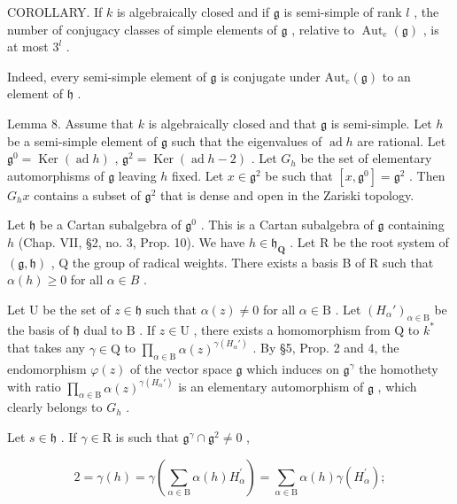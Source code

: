 COROLLARY. If \(k\) is algebraically closed and if \(\mathfrak{g}\) is semi-simple of rank \(l\) , the number of conjugacy classes of simple elements of \(\mathfrak{g}\) , relative to \(\operatorname{Aut}_e(\mathfrak{g})\) , is at most \(3^l\) .

Indeed, every semi-simple element of \(\mathfrak{g}\) is conjugate under \(\mathrm{Aut}_e(\mathfrak{g})\) to an element of \(\mathfrak{h}\) .

Lemma 8. Assume that \(k\) is algebraically closed and that \(\mathfrak{g}\) is semi-simple. Let \(h\) be a semi-simple element of \(\mathfrak{g}\) such that the eigenvalues of \(\operatorname{ad} h\) are rational. Let \(\mathfrak{g}^0 = \operatorname{Ker}(\operatorname{ad} h)\) , \(\mathfrak{g}^2 = \operatorname{Ker}(\operatorname{ad} h - 2)\) . Let \(G_h\) be the set of elementary automorphisms of \(\mathfrak{g}\) leaving \(h\) fixed. Let \(x \in \mathfrak{g}^2\) be such that \([x, \mathfrak{g}^0] = \mathfrak{g}^2\) . Then \(G_h x\) contains a subset of \(\mathfrak{g}^2\) that is dense and open in the Zariski topology.

Let \(\mathfrak{h}\) be a Cartan subalgebra of \(\mathfrak{g}^0\) . This is a Cartan subalgebra of \(\mathfrak{g}\) containing \(h\) (Chap. VII, §2, no. 3, Prop. 10). We have \(h \in \mathfrak{h}_{\mathbf{Q}}\) . Let R be the root system of \((\mathfrak{g}, \mathfrak{h})\) , Q the group of radical weights. There exists a basis B of R such that \(\alpha(h) \geq 0\) for all \(\alpha \in B\) .

Let \(\mathrm{U}\) be the set of \(z \in \mathfrak{h}\) such that \(\alpha(z) \neq 0\) for all \(\alpha \in \mathrm{B}\) . Let \((H_{\alpha}')_{\alpha \in \mathrm{B}}\) be the basis of \(\mathfrak{h}\) dual to \(\mathrm{B}\) . If \(z \in \mathrm{U}\) , there exists a homomorphism from \(\mathrm{Q}\) to \(k^*\) that takes any \(\gamma \in \mathrm{Q}\) to \(\prod_{\alpha \in \mathrm{B}} \alpha(z)^{\gamma(H_{\alpha}')}\) . By §5, Prop. 2 and 4, the endomorphism \(\varphi(z)\) of the vector space \(\mathfrak{g}\) which induces on \(\mathfrak{g}^{\gamma}\) the homothety with ratio \(\prod_{\alpha \in \mathrm{B}} \alpha(z)^{\gamma(H_{\alpha}')}\) is an elementary automorphism of \(\mathfrak{g}\) , which clearly belongs to \(G_h\) .

Let \(s \in \mathfrak{h}\) . If \(\gamma \in \mathrm{R}\) is such that \(\mathfrak{g}^{\gamma} \cap \mathfrak{g}^{2} \neq 0\) ,

\[
2 = \gamma (h) = \gamma \left(\sum_ {\alpha \in \mathrm{B}} \alpha (h) H _ {\alpha} ^ {\prime}\right) = \sum_ {\alpha \in \mathrm{B}} \alpha (h) \gamma (H _ {\alpha} ^ {\prime});
\]

